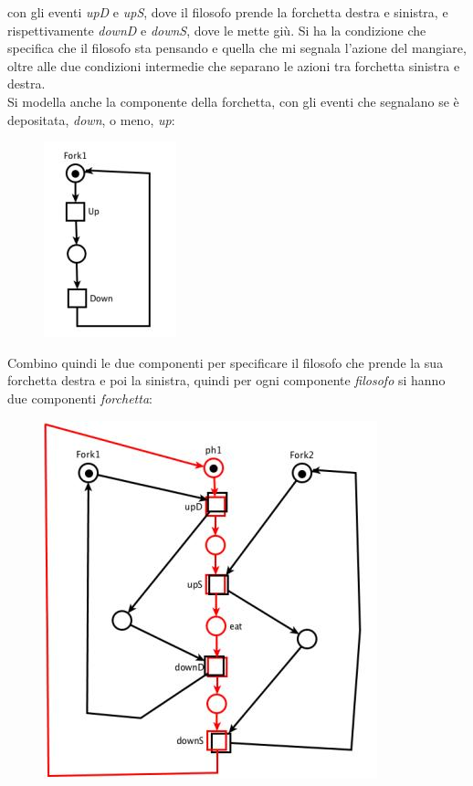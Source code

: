 \documentclass[a4paper,12pt, oneside]{book}
\begin{document}
con gli eventi \textit{upD} e \textit{upS}, dove il filosofo prende la forchetta
destra e sinistra, e rispettivamente \textit{downD} e \textit{downS}, dove le
mette giù. Si ha la condizione che specifica che il filosofo sta pensando e
quella che mi segnala l'azione del mangiare, oltre alle due condizioni
intermedie che separano le azioni tra forchetta sinistra e destra.\\
Si modella anche la componente della forchetta, con gli eventi che segnalano se
è depositata, \textit{down}, o meno, \textit{up}:
\begin{figure}[H]
  \centering
  \includegraphics[scale = 0.5]{img/pt12.jpg}
\end{figure}
\newpage
Combino quindi le due componenti per specificare il filosofo che prende la sua
forchetta destra e poi la sinistra, quindi per ogni componente \textit{filosofo}
si hanno due componenti \textit{forchetta}:
\begin{figure}[H]
  \centering
  \includegraphics[scale = 0.5]{img/pt13.jpg}
\end{figure}
\end{document}

